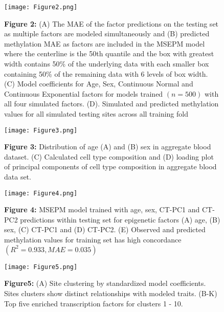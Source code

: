 \documentclass[sn-nature]{sn-jnl}
\begin{document}
{\begin{center}
    \begin{figure}
    \texttt{[image: Figure2.png]}
    \footnotesize
    \caption*{\small \textbf{Figure 2:} (A) The MAE of the factor predictions on the testing set as multiple factors are modeled simultaneously and 
    (B) predicted methylation MAE as factors are included in the MSEPM model where the centerline is the 50th quantile and the box 
    with greatest width contains 50\% of the underlying data with each smaller box containing 50\% of the remaining data 
    with 6 levels of box width. (C) Model coefficients for 
Age, Sex, Continuous Normal and Continuous Exponential factors for models trained $(n = 500)$ with all four simulated 
factors. (D). Simulated and predicted methylation values for all simulated testing sites across all training fold }
    \end{figure}
\end{center}


\begin{center}
    \begin{figure}
    \texttt{[image: Figure3.png]}
    \footnotesize
    \caption*{\small \textbf{Figure 3:} Distribution of age (A) and (B) sex in aggregate blood dataset. (C) Calculated cell type composition and (D) loading plot of
 principal components of cell type composition in aggregate blood data set.}
    \end{figure}
\end{center}

\begin{raggedleft}
\begin{figure}
\texttt{[image: Figure4.png]}
\footnotesize
\caption*{\small \textbf{Figure 4:} MSEPM model trained with age, sex, CT-PC1 and CT-PC2 predictions within testing 
set for epigenetic factors (A) age, (B) sex, (C) CT-PC1 and (D) CT-PC2. (E) Observed and predicted
 methylation values for training set has high concordance $(R^2=0.933, MAE=0.035)$}
\end{figure}
\end{raggedleft}

\begin{center}
    \begin{figure}
    \texttt{[image: Figure5.png]}
    \footnotesize
    \caption*{\small \textbf{Figure5: } (A) Site clustering by standardized model coefficients. Sites clusters show 
    distinct relationships with modeled traits. (B-K) Top five enriched transcription factors for clusters 1 - 10. 
    }
    \end{figure}
\end{center}

}
\end{document}

